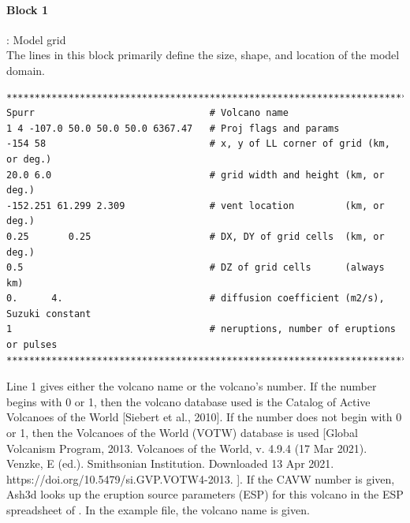 \paragraph{Block 1}: Model grid\\
The lines in this block primarily define the size, shape,
and location of the model domain.
\small
\begin{verbatim}
*******************************************************************************
Spurr                               # Volcano name
1 4 -107.0 50.0 50.0 50.0 6367.47   # Proj flags and params
-154 58                             # x, y of LL corner of grid (km, or deg.)
20.0 6.0                            # grid width and height (km, or deg.)
-152.251 61.299 2.309               # vent location         (km, or deg.)
0.25       0.25                     # DX, DY of grid cells  (km, or deg.)
0.5                                 # DZ of grid cells      (always km)
0.      4.                          # diffusion coefficient (m2/s), Suzuki constant
1                                   # neruptions, number of eruptions or pulses
*******************************************************************************
\end{verbatim}
\normalsize

Line 1 gives either the volcano name or the volcano’s number.
If the number begins with 0 or 1, then the volcano database used is
the Catalog of Active Volcanoes of the World [Siebert et al., 2010].
If the number does not begin with 0 or 1, then the Volcanoes of the
World (VOTW) database is used
[Global Volcanism Program, 2013. Volcanoes of the World, v. 4.9.4 (17 Mar 2021). Venzke, E (ed.). Smithsonian Institution. Downloaded 13 Apr 2021. https://doi.org/10.5479/si.GVP.VOTW4-2013. ].
If the CAVW number is given, Ash3d looks up the eruption source
parameters (ESP) for this volcano in the ESP spreadsheet of
\cite{Mastin09a}. In the example file, the volcano name
is given.


